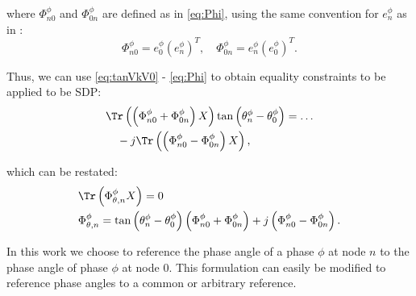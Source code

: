\noindent where $\Phi_{n0}^{\phi}$ and $\Phi_{0n}^{\phi}$ are defined as in \eqref{eq:Phi}, using the same convention for $e_{n}^{\phi}$ as in \cite{dall2012optimization}:
\begin{equation}
	\Phi_{n0}^{\phi} = e_{0}^{\phi} \left( e_{n}^{\phi} \right)^{T},
    \quad
    \Phi_{0n}^{\phi} = e_{n}^{\phi} \left( e_{0}^{\phi} \right)^{T}.
    \label{eq:Phi}
\end{equation}

\noindent Thus, we can use \eqref{eq:tanVkV0} - \eqref{eq:Phi} to obtain equality constraints to be applied to be SDP:
\begin{align}
	& \Tr \left( \left( \Phi_{n0}^{\phi} + \Phi_{0n}^{\phi} \right) X \right)
    \tan \left( \theta_{n}^{\phi} - \theta_{0}^{\phi} \right)
    = \ldots \nonumber \\
    & \quad -j \Tr \left( \left( \Phi_{n0}^{\phi} - \Phi_{0n}^{\phi} \right) X \right),
\end{align}

\noindent which can be restated:
\begin{align}
    & \Tr \left(\Phi_{\theta,n}^{\phi} X \right) = 0 \\
    & \Phi_{\theta,n}^{\phi} = \tan \left( \theta_{n}^{\phi} - \theta_{0}^{\phi} \right)
    \left( \Phi_{n0}^{\phi} + \Phi_{0n}^{\phi} \right)
    +
    j \left( \Phi_{n0}^{\phi} - \Phi_{0n}^{\phi} \right).
\end{align}

\noindent In this work we choose to reference the phase angle of a phase $\phi$ at node $n$ to the phase angle of phase $\phi$ at node $0$. This formulation can easily be modified to reference phase angles to a common or arbitrary reference. \\